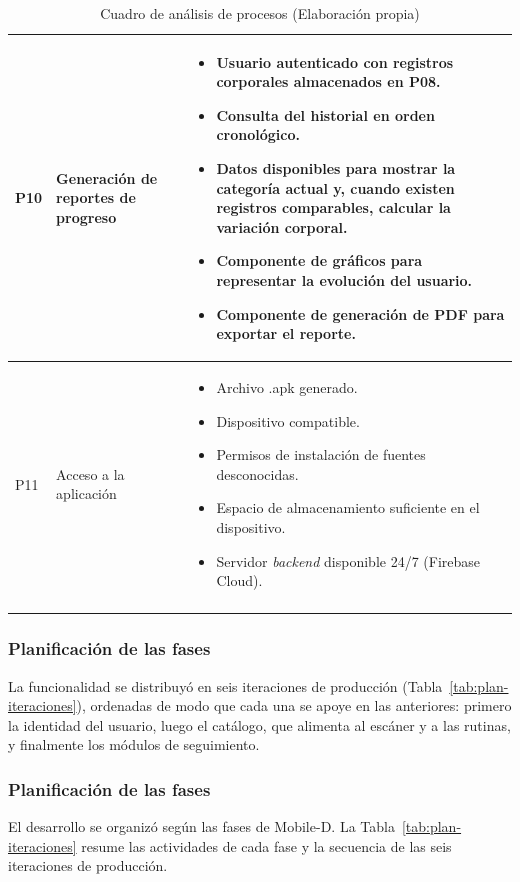 {\begin{longtable}{|L{1.3cm}|L{3.3cm}|L{9cm}|}
P10 & Generación de reportes de progreso &
\begin{itemize}
    \item Usuario autenticado con registros corporales almacenados en P08.
    \item Consulta del historial en orden cronológico.
    \item Datos disponibles para mostrar la categoría actual y, cuando
    existen registros comparables, calcular la variación corporal.
    \item Componente de gráficos para representar la evolución del usuario.
    \item Componente de generación de PDF para exportar el reporte.
\end{itemize}
\\ \hline
P11 & Acceso a la aplicación &
\begin{itemize}
    \item Archivo .apk generado.
    \item Dispositivo compatible.
    \item Permisos de instalación de fuentes desconocidas.
    \item Espacio de almacenamiento suficiente en el dispositivo.
    \item Servidor \emph{backend} disponible 24/7 (Firebase Cloud).
\end{itemize}
\\ \hline
\caption{Cuadro de análisis de procesos (Elaboración propia)}
\label{tab:procesos}\\
\end{longtable}
}

\subsubsection{Planificación de las fases}

La funcionalidad se distribuyó en seis iteraciones de producción
(Tabla~\ref{tab:plan-iteraciones}), ordenadas de modo que cada una se apoye en
las anteriores: primero la identidad del usuario, luego el catálogo, que
alimenta al escáner y a las rutinas, y finalmente los módulos de seguimiento.

\subsubsection{Planificación de las fases}

El desarrollo se organizó según las fases de Mobile-D. La
Tabla~\ref{tab:plan-iteraciones} resume las actividades de cada fase y
la secuencia de las seis iteraciones de producción.

